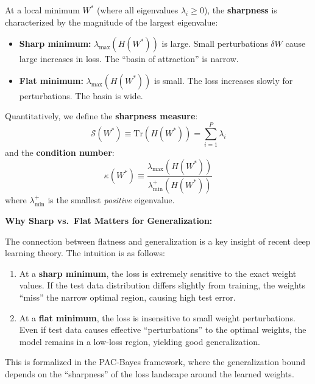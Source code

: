\documentclass[
  journal=largetwo,
  year=2025,
  volume=37,
]{cup-journal}
\begin{document}
\begin{definition}\label{def:sharp_flat}
At a local minimum $W^*$ (where all eigenvalues $\lambda_i \geq 0$), the \textbf{sharpness} is characterized by the magnitude of the largest eigenvalue:
\begin{itemize}
    \item \textbf{Sharp minimum:} $\lambda_{\max}(H(W^*))$ is large. Small perturbations $\delta W$ cause large increases in loss. The ``basin of attraction'' is narrow.
    \item \textbf{Flat minimum:} $\lambda_{\max}(H(W^*))$ is small. The loss increases slowly for perturbations. The basin is wide.
\end{itemize}

Quantitatively, we define the \textbf{sharpness measure}:
\begin{equation}
    \mathcal{S}(W^*) \equiv \text{Tr}(H(W^*)) = \sum_{i=1}^{P} \lambda_i
\end{equation}
and the \textbf{condition number}:
\begin{equation}
    \kappa(W^*) \equiv \frac{\lambda_{\max}(H(W^*))}{\lambda_{\min}^{+}(H(W^*))}
\end{equation}
where $\lambda_{\min}^{+}$ is the smallest \textit{positive} eigenvalue.
\end{definition}

\textbf{Why Sharp vs.\ Flat Matters for Generalization:}

The connection between flatness and generalization is a key insight of recent deep learning theory. The intuition is as follows:
\begin{enumerate}
    \item At a \textbf{sharp minimum}, the loss is extremely sensitive to the exact weight values. If the test data distribution differs slightly from training, the weights ``miss'' the narrow optimal region, causing high test error.
    
    \item At a \textbf{flat minimum}, the loss is insensitive to small weight perturbations. Even if test data causes effective ``perturbations'' to the optimal weights, the model remains in a low-loss region, yielding good generalization.
\end{enumerate}

This is formalized in the PAC-Bayes framework, where the generalization bound depends on the ``sharpness'' of the loss landscape around the learned weights.
\end{document}
